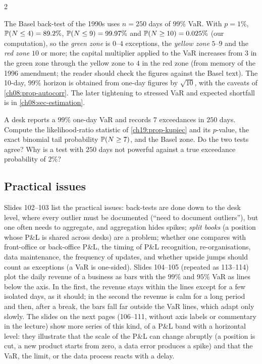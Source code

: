\begin{paracol}{2}
\begin{finance}\label{ch19:fin-basel}
The Basel back-test of the 1990s uses $n=250$ days of $99\%$ VaR. With $p=1\%$, $\mathbb{P}(N\le4)=89.2\%$, $\mathbb{P}(N\le9)=99.97\%$ and $\mathbb{P}(N\ge10)=0.025\%$ (our computation), so the \emph{green zone} is $0$--$4$ exceptions, the \emph{yellow zone} $5$--$9$ and the \emph{red zone} $10$ or more; the capital multiplier applied to the VaR increases from $3$ in the green zone through the yellow zone to $4$ in the red zone (from memory of the 1996 amendment; the reader should check the figures against the Basel text). The 10-day, $99\%$ horizon is obtained from one-day figures by $\sqrt{10}$, with the caveats of \cref{ch08:prop-autocorr}. The later tightening to stressed VaR and expected shortfall is in \cref{ch08:sec-estimation}.
\end{finance}

\begin{exercise}
A desk reports a $99\%$ one-day VaR and records $7$ exceedances in $250$ days. Compute the likelihood-ratio statistic of \cref{ch19:prop-kupiec} and its $p$-value, the exact binomial tail probability $\mathbb{P}(N\ge7)$, and the Basel zone. Do the two tests agree? Why is a test with $250$ days not powerful against a true exceedance probability of $2\%$?
\end{exercise}

\subsection{Practical issues}
Slides 102--103 list the practical issues: back-tests are done down to the desk level, where every outlier must be documented (``need to document outliers''), but one often needs to aggregate, and aggregation hides spikes; \emph{split books} (a position whose P\&L is shared across desks) are a problem; whether one compares with front-office or back-office P\&L, the timing of P\&L recognition, re-organisations, data maintenance, the frequency of updates, and whether upside jumps should count as exceptions (a VaR is one-sided). Slides 104--105 (repeated as 113--114) plot the daily revenue of a business as bars with the $99\%$ and $95\%$ VaR as lines below the axis. In the first, the revenue stays within the lines except for a few isolated days, as it should; in the second the revenue is calm for a long period and then, after a break, the bars fall far outside the VaR lines, which adapt only slowly. The slides on the next pages (106--111, without axis labels or commentary in the lecture) show more series of this kind, of a P\&L band with a horizontal level: they illustrate that the scale of the P\&L can change abruptly (a position is cut, a new product starts from zero, a data error produces a spike) and that the VaR, the limit, or the data process reacts with a delay.


\end{paracol}
